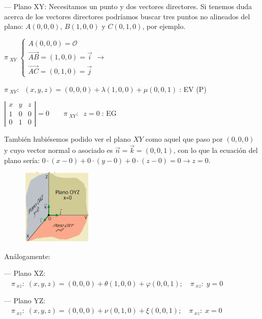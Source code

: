 \begin{proofw}\renewcommand{\qedsymbol}{$\diamond$}
--- Plano XY: Necesitamos un punto y dos vectores directores. Si tenemos duda acerca de los vectores directores podríamos buscar tres puntos no alineados del plano: $A(0,0,0)	$, $B(1,0,0)$ y $C(0,1,0)$, por ejemplo.

\noindent $\pi_{\;XY} \; \begin{cases} A(0,0,0)=\mathcal O \\ \overrightarrow{AB}=(1,0,0)=\vec i \\ \overrightarrow{AC}=(0,1,0)=\vec j \end{cases} \to $

 \hspace{10mm} $\pi_{\; XY}:\;\;(x,y,z)=(0,0,0)+\lambda(1,0,0)+\mu (0,0,1)\;$: EV (P)

 \hspace{10mm}  $\left| \begin{matrix} x&y&z\\1&0&0\\0&1&0 \end{matrix} \right|=0 \qquad \pi_{\;XY}:\;\;z=0\;$: EG
 
 \begin{multicols}{2}
 \noindent \small{\textcolor{gris}{También hubiésemos podido ver el plano $XY$ como aquel que paso por $(0,0,0)$ y cuyo vector normal o asociado es $\vec n=\vec k=(0,0,1)$, con lo que la ecuación del plano sería: $0\cdot (x-0)+0\cdot (y-0)+0\cdot (z-0)=0 \to z=0$}}\normalsize{.}
 
 \begin{figure}[H]
		\centering
		\includegraphics[width=0.3\textwidth]{imagenes/imagenes10/T10IM05.png}
 \end{figure}
 \end{multicols}	
 
 \noindent Análogamente:
 
 \noindent --- Plano XZ: \small{$\quad \pi_{\; xz}:\; (x,y,z)=(0,0,0)+\theta (1,0,0)+\varphi (0,0,1); \quad \pi_{\; xz}:\; y=0$}
 
 \noindent --- Plano YZ: \small{$\quad \pi_{\; xz}:\; (x,y,z)=(0,0,0)+\nu (0,1,0)+\xi (0,0,1); \quad \pi_{\; xz}:\; x=0$}
 

\end{proofw}
